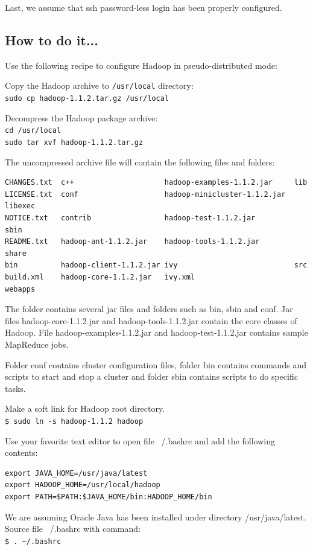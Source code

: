 Last, we assume that ssh password-less login has been properly configured.
\subsection*{How to do it...}
Use the following recipe to configure Hadoop in pseudo-distributed mode:

Copy the Hadoop archive to \verb|/usr/local| directory:\\
\verb|sudo cp hadoop-1.1.2.tar.gz /usr/local|

Decompress the Hadoop package archive: \\
\verb|cd /usr/local| \\
\verb|sudo tar xvf hadoop-1.1.2.tar.gz|

The uncompressed archive file will contain the following files and folders:
\lstset{style=bashstyle}
\begin{lstlisting}
CHANGES.txt  c++                     hadoop-examples-1.1.2.jar     lib
LICENSE.txt  conf                    hadoop-minicluster-1.1.2.jar  libexec
NOTICE.txt   contrib                 hadoop-test-1.1.2.jar         sbin
README.txt   hadoop-ant-1.1.2.jar    hadoop-tools-1.1.2.jar        share
bin          hadoop-client-1.1.2.jar ivy                           src
build.xml    hadoop-core-1.1.2.jar   ivy.xml                       webapps
\end{lstlisting}
The folder contains several jar files and folders such as bin, sbin and conf. Jar files hadoop-core-1.1.2.jar and hadoop-tools-1.1.2.jar contain the core classes of Hadoop. File hadoop-examples-1.1.2.jar and hadoop-test-1.1.2.jar contains sample MapReduce jobs.

Folder conf contains cluster configuration files, folder bin contains commands and scripts to start and stop a cluster and folder sbin contains scripts to do specific tasks.

Make a soft link for Hadoop root directory. \\
\verb|$ sudo ln -s hadoop-1.1.2 hadoop|

Use your favorite text editor to open file ~/.bashrc and add the following contents: 
\begin{verbatim}
export JAVA_HOME=/usr/java/latest
export HADOOP_HOME=/usr/local/hadoop
export PATH=$PATH:$JAVA_HOME/bin:HADOOP_HOME/bin
\end{verbatim}

We are assuming Oracle Java has been installed under directory /usr/java/latest. \\
Source file ~/.bashrc with command: \\
\verb|$ . ~/.bashrc|

